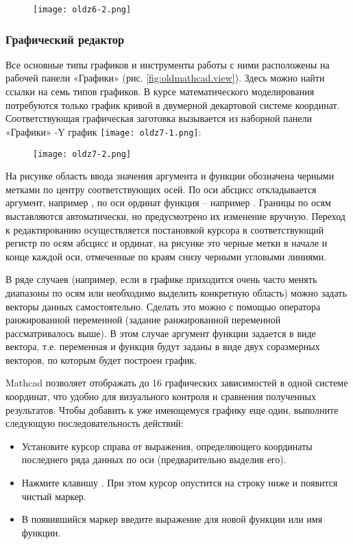 \begin{figure}[h]
	\begin{center}
		\texttt{[image: oldz6-2.png]}
	\end{center}
\end{figure}

\subsubsection{Графический редактор}
Все основные типы графиков и инструменты работы с ними расположены на рабочей панели «Графики» (рис. \ref{fig:oldmathcad.view}). Здесь можно найти ссылки на семь типов графиков. В курсе математического моделирования потребуются только график кривой в двумерной декартовой системе координат. Соответствующая графическая заготовка вызывается из наборной панели «Графики» -Y график 
\texttt{[image: oldz7-1.png]}:
\begin{figure}[h]
	\begin{center}
		\texttt{[image: oldz7-2.png]}
	\end{center}
\end{figure}

На рисунке область ввода значения аргумента и функции обозначена черными метками по центру соответствующих осей. По оси абсцисс откладывается аргумент, например , по оси ординат функция -- например . Границы по осям выставляются автоматически, но предусмотрено их изменение вручную. Переход к редактированию осуществляется постановкой курсора в соответствующий регистр по осям абсцисс и ординат, на рисунке это черные метки в начале и конце каждой оси, отмеченные по краям снизу черными угловыми линиями.

В ряде случаев (например, если в графике приходится очень часто менять диапазоны по осям или необходимо выделить конкретную область) можно задать векторы данных самостоятельно. Сделать это можно с помощью оператора ранжированной переменной (задание ранжированной переменной рассматривалось выше). В этом случае аргумент функции задается в виде вектора, т.е. переменная и функция будут заданы в виде двух соразмерных векторов, по которым будет построен график.

Mathcad позволяет отображать до 16 графических зависимостей в одной системе координат, что удобно для визуального контроля и сравнения полученных результатов. Чтобы добавить к уже имеющемуся графику еще один, выполните следующую последовательность действий:
\begin{itemize}
	\item Установите курсор справа от выражения, определяющего координаты последнего ряда данных по оси  (предварительно выделив его).
	\item Нажмите клавишу \keys{,}. При этом курсор опустится на строку ниже и появится чистый маркер.
	\item В появившийся маркер введите выражение для новой функции или имя функции.
\end{itemize}

